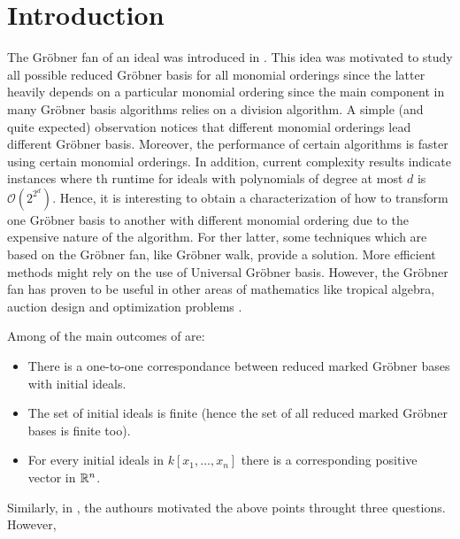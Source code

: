 \section{Introduction}

The Gr\"obner fan of an ideal was introduced in \cite{MORA1988183}.
This idea was motivated to study all possible reduced Gr\"obner
basis for all monomial orderings since the latter heavily depends
on a particular monomial ordering \cite{Cox:2015:IVA:2821082}
since the main component in many Gr\"obner basis algorithms
relies on a division algorithm. A simple (and quite expected)
observation notices that different monomial orderings lead
different Gr\"obner basis. Moreover, the performance of certain
algorithms is faster using certain monomial orderings. In addition,
current complexity results \cite{MAYR1982305} indicate instances
where th runtime for ideals with polynomials of
degree at most $d$ is $\mathcal{O}(2^{2^d})$. Hence, it is interesting to
obtain a characterization of how to transform one Gr\"obner
basis to another with different monomial ordering due to the expensive
nature of the algorithm. For ther latter,
some techniques which are based on the Gr\"obner fan, like Gr\"obner walk,
provide a solution. More efficient methods might rely on the use of
Universal Gr\"obner basis. However, the Gr\"obner fan has proven to
be useful in other areas of mathematics like tropical algebra, auction
design and optimization problems \cite{2014arXiv1408.0313K}.

Among of the main outcomes of \cite{MORA1988183} are:

\begin{itemize}
\item There is a one-to-one correspondance between reduced
  marked Gr\"obner bases with initial ideals.
\item The set of initial ideals is finite (hence the set of all
  reduced marked Gr\"obner bases is finite too).
\item For every initial ideals in $k[x_1, \dots, x_n]$
  there is a corresponding positive vector in $\mathbb{R}^n$.  
\end{itemize}

Similarly, in \cite{Cox:2014}, the authours motivated the above points
throught three questions. However, 

